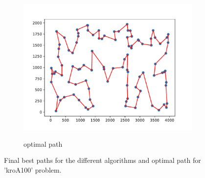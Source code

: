 \documentclass[12pt]{article}
\theoremstyle{plain}
\theoremstyle{definition}
\theoremstyle{remark}
\begin{document}
\begin{figure}[ht]
\begin{subfigure}{.5\textwidth}
		\includegraphics[scale = 0.44]{../../Implementation/gen/optimal_path_kroA100}
		\label{fig:optimal_path_kroA100}
		\caption{optimal path}
	\end{subfigure}
	\caption{Final best paths for the different algorithms and optimal path for 'kroA100' problem.}
	\label{fig:final_paths_kroA100}
\end{figure}
\newpage
\end{document}

